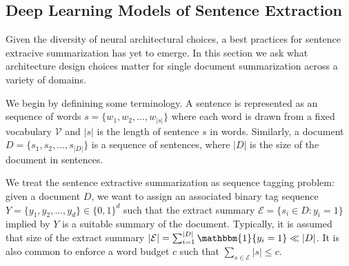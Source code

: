 
\newcommand{\sent}{s}
\newcommand{\Sents}{\mathcal{S}}
\newcommand{\doc}{D}
\newcommand{\lbl}{y}
\newcommand{\Labels}{Y}
\newcommand{\word}{w}
\newcommand{\vocab}{\mathcal{V}}
\newcommand{\extracts}{\mathcal{E}}
\newcommand{\budget}{c}
\newcommand{\encoder}{\textsc{Encoder}}
\newcommand{\extractor}{\textsc{Extractor}}
\newcommand{\embproj}{W}
\newcommand{\emb}{\omega}
\newcommand{\embsize}{n}
\newcommand{\sembsize}{m}
\newcommand{\semb}{h}
\newcommand{\rsemb}{\overrightarrow{\semb}}
\newcommand{\lsemb}{\overleftarrow{\semb}}
\newcommand{\gru}{\textsc{Gru}}
\newcommand{\rgru}{\overrightarrow{\gru}}
\newcommand{\lgru}{\overleftarrow{\gru}}
\newcommand{\cfeat}[2]{f_{#1}^{( #2 )}}
\newcommand{\relu}{\textsc{ReLU}}
\newcommand{\winsize}{k}
\newcommand{\winsizes}{K}
\newcommand{\fmapsize}{F}
\newcommand{\cfidx}{l}
\newcommand{\cact}{a^{(\cfidx,\winsize)}}
\newcommand{\cnnbias}{u^{(\winsize)}}
\newcommand{\cnnweight}{U^{(\winsize)}}
\newcommand{\cnnBiasSpace}{\mathbb{R}^{\fmapsize_\winsize}}
\newcommand{\cnnWeightSpace}{\mathbb{R}^{\winsize \times \fmapsize_\winsize \times \embsize}}


\subsection{Deep Learning Models of Sentence Extraction}

 Given the diversity of neural architectural choices, a best practices
for sentence extracive summarization has yet to emerge. In this section
we ask what architecture design choices matter for single document 
summarization across a variety of domains.

We begin by definining some terminology. A sentence is represented as an
sequence of words $\sent = \{\word_1, \word_2, \ldots, \word_{|\sent|} \}$
where each word is drawn from a fixed vocabulary $\vocab$ and $|\sent|$ is
the length of sentence $\sent$ in words. Similarly, a document $\doc = \{ 
\sent_1, \sent_2, \ldots, \sent_{|\doc|} \}$ is a sequence of sentences, where 
$|\doc|$ is the size of the document in sentences.  

We treat the sentence extractive summarization as sequence tagging
problem: given a document $\doc$, we want to assign an associated binary
tag sequence $\Labels = \{\lbl_1, \lbl_2, \ldots, \lbl_d \}
\in \{0,1\}^d$ such that the extract summary $\extracts = \{ 
\sent_i \in \doc : \lbl_i =1 \}$ implied by $\Labels$ is a suitable summary
of the document. Typically, it is assumed that size of the extract summary
$|\extracts| = \sum_{i=1}^{|\doc|} \mathbbm{1}\{\lbl_i =1 \} \ll |\doc|$.
It is also common to enforce a word budget $\budget$ such that
$\sum_{\sent \in \extracts} |\sent| \le \budget$.

